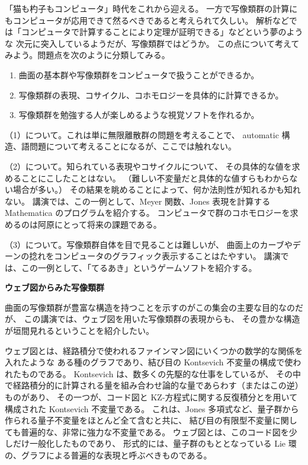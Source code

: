 \documentclass[uplatex,dvipdfmx]{jlreq}
\begin{document}
\medskip

「猫も杓子もコンピュータ」時代をこれから迎える。
一方で写像類群の計算にもコンピュータが応用できて然るべきであると考えられて久しい。
解析などでは「コンピュータで計算することにより定理が証明できる」などという夢のような
次元に突入しているようだが、写像類群ではどうか。
この点について考えてみよう。問題点を次のように分類してみる。
\begin{enumerate}
  \setlength{\itemsep}{2pt}
  \item[(1)] 曲面の基本群や写像類群をコンピュータで扱うことができるか。
  \item[(2)] 写像類群の表現、コサイクル、コホモロジーを具体的に計算できるか。
  \item[(3)] 写像類群を勉強する人が楽しめるような視覚ソフトを作れるか。
\end{enumerate}

（1）について。これは単に無限離散群の問題を考えることで、
automatic 構造、語問題について考えることになるが、ここでは触れない。

（2）について。知られている表現やコサイクルについて、
その具体的な値を求めることにこしたことはない。
（難しい不変量だと具体的な値すらもわからない場合が多い。）
その結果を眺めることによって、何か法則性が知れるかも知れない。
講演では、この一例として、Meyer 関数、Jones 表現を計算する
Mathematica のプログラムを紹介する。
コンピュータで群のコホモロジーを求めるのは阿原にとって将来の課題である。

（3）について。写像類群自体を目で見ることは難しいが、
曲面上のカーブやデーンの捻れをコンピュータのグラフィック表示することはたやすい。
講演では、この一例として、「てるあき」というゲームソフトを紹介する。

\newpage

\begin{center}
{\large\bfseries ウェブ図からみた写像類群}

\hspace*{\fill}{\large\bfseries 村上 順（阪大・理）}
\end{center}

\medskip

曲面の写像類群が豊富な構造を持つことを示すのがこの集会の主要な目的なのだが、
この講演では、ウェブ図を用いた写像類群の表現からも、
その豊かな構造が垣間見れるということを紹介したい。

ウェブ図とは、経路積分で使われるファインマン図にいくつかの数学的な関係を入れたような
ある種のグラフであり、結び目の Kontsevich 不変量の構成で使われたものである。
Kontsevich は、数多くの先駆的な仕事をしているが、
その中で経路積分的に計算される量を組み合わせ論的な量であらわす（またはこの逆）ものがあり、
その一つが、コード図と KZ-方程式に関する反復積分とを用いて構成された Kontsevich 不変量である。
これは、Jones 多項式など、量子群から作られる量子不変量をほとんど全て含むと共に、
結び目の有限型不変量に関しても普遍的な、非常に強力な不変量である。
ウェブ図とは、このコード図を少しだけ一般化したものであり、
形式的には、量子群のもととなっている Lie 環の、グラフによる普遍的な表現と呼ぶべきものである。
\end{document}
